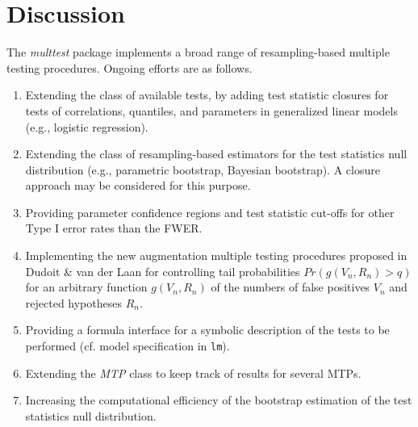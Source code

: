 \documentclass[11pt]{article}
\newcommand{\Rpackage}[1]{\textit{#1}}
\newcommand{\Robject}[1]{\texttt{#1}}
\newcommand{\Rclass}[1]{\textit{#1}}
\begin{document}
\section{Discussion}
\label{anal:mult:s:disc}

The \Rpackage{multtest} package implements a broad range of resampling-based multiple testing procedures. Ongoing efforts are as follows.
\begin{enumerate}
\item
Extending the class of available tests, by adding test statistic closures for tests of correlations, quantiles, and parameters in generalized linear models (e.g., logistic regression).
\item
Extending the class of resampling-based estimators for the test statistics null distribution (e.g., parametric bootstrap, Bayesian bootstrap). A closure approach may be considered for this purpose.
\item
Providing parameter confidence regions and test statistic cut-offs for other Type I error rates than the FWER.
\item
Implementing the new augmentation multiple testing procedures proposed in Dudoit \& van der Laan \cite{Dudoit&vdLaanMTBook} for controlling tail probabilities $Pr(g(V_n,R_n) > q)$ for an arbitrary function $g(V_n,R_n)$ of the numbers of false positives $V_n$ and rejected hypotheses $R_n$.
\item
Providing a formula interface for a symbolic description of the tests to be performed (cf. model specification in \Robject{lm}).
\item
Extending the \Rclass{MTP} class to keep track of results for several MTPs.
\item
Increasing the computational efficiency of the bootstrap estimation of the test statistics null distribution.
\end{enumerate}






\end{document}
